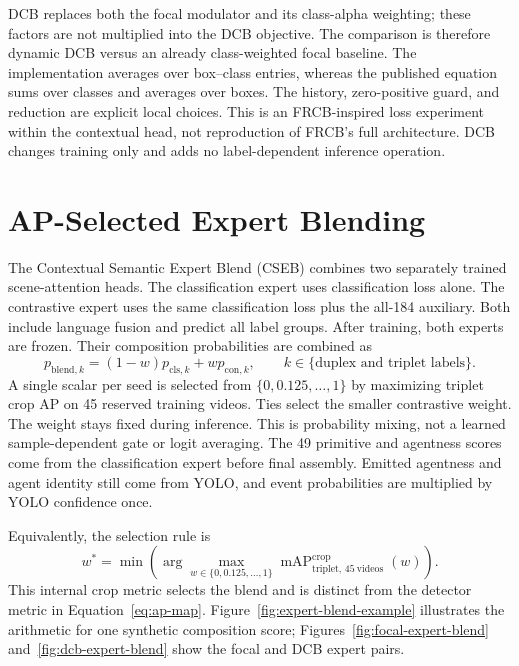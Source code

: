 DCB replaces both the focal modulator and its class-alpha weighting; these factors are not multiplied into the DCB objective. The comparison is therefore dynamic DCB versus an already class-weighted focal baseline. The implementation averages over box--class entries, whereas the published equation sums over classes and averages over boxes. The history, zero-positive guard, and reduction are explicit local choices. This is an FRCB-inspired loss experiment within the contextual head, not reproduction of FRCB's full architecture. DCB changes training only and adds no label-dependent inference operation.

\section{AP-Selected Expert Blending}

The Contextual Semantic Expert Blend (CSEB) combines two separately trained scene-attention heads. The classification expert uses classification loss alone. The contrastive expert uses the same classification loss plus the all-184 auxiliary. Both include language fusion and predict all label groups. After training, both experts are frozen. Their composition probabilities are combined as
\begin{equation}\label{eq:blend}
 p_{\mathrm{blend},k}=(1-w)p_{\mathrm{cls},k}+wp_{\mathrm{con},k},
 \qquad k\in\{\text{duplex and triplet labels}\}.
\end{equation}
A single scalar per seed is selected from \(\{0,0.125,\ldots,1\}\) by maximizing triplet crop AP on 45 reserved training videos. Ties select the smaller contrastive weight. The weight stays fixed during inference. This is probability mixing, not a learned sample-dependent gate or logit averaging. The 49 primitive and agentness scores come from the classification expert before final assembly. Emitted agentness and agent identity still come from YOLO, and event probabilities are multiplied by YOLO confidence once.

Equivalently, the selection rule is
\begin{equation}\label{eq:blend-selection}
 w^*=\min\!\left(\arg\max_{w\in\{0,0.125,\ldots,1\}}
 \operatorname{mAP}^{\mathrm{crop}}_{\mathrm{triplet},\,45\ \mathrm{videos}}(w)\right).
\end{equation}
This internal crop metric selects the blend and is distinct from the detector metric in Equation~\ref{eq:ap-map}. Figure~\ref{fig:expert-blend-example} illustrates the arithmetic for one synthetic composition score; Figures~\ref{fig:focal-expert-blend} and~\ref{fig:dcb-expert-blend} show the focal and DCB expert pairs.

